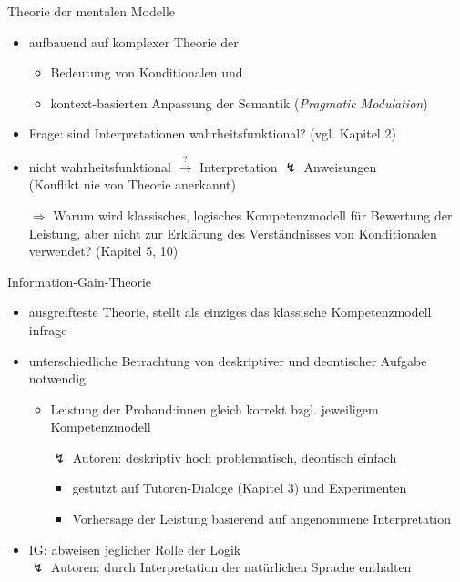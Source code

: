 \begin{frame}{Theorie der mentalen Modelle {\scriptsize \cite[S.~113-114]{stenningHumanReasoningCognitive2008}}}
    \begin{itemize}
        \item aufbauend auf komplexer Theorie der
        \begin{itemize}
            \item Bedeutung von Konditionalen und
            \item kontext-basierten Anpassung der Semantik {\footnotesize (\emph{Pragmatic Modulation})}
        \end{itemize}
        
        \item Frage: sind Interpretationen wahrheitsfunktional? {\scriptsize (vgl. Kapitel 2)}
        
        \item nicht wahrheitsfunktional $\overset?\to$ Interpretation $\lightning$ Anweisungen \\
            {\footnotesize (Konflikt nie von Theorie anerkannt)}
        \pause

        \item[$\Rightarrow$] Warum wird klassisches, logisches Kompetenzmodell für \alert{Bewertung der Leistung}, 
            aber nicht zur Erklärung des \alert{Verständnisses von Konditionalen} verwendet? {\footnotesize (Kapitel 5, 10)}
    \end{itemize}
\end{frame}


\begin{frame}{Information-Gain-Theorie {\scriptsize \cite[S.~114-115]{stenningHumanReasoningCognitive2008}}}
    \begin{itemize}
        \item ausgreifteste Theorie, stellt als einziges das klassische Kompetenzmodell infrage
        \item unterschiedliche Betrachtung von deskriptiver und deontischer Aufgabe notwendig
        
        \pause
        \begin{itemize}
            \item Leistung der Proband:innen gleich korrekt bzgl. jeweiligem Kompetenzmodell
            \item[$\lightning$] Autoren: deskriptiv hoch problematisch, deontisch einfach
            \begin{itemize}
                \item gestützt auf Tutoren-Dialoge (Kapitel 3) und Experimenten
                \item Vorhersage der Leistung basierend auf angenommene Interpretation
            \end{itemize}
        \end{itemize}

        \pause
        \item IG: abweisen jeglicher Rolle der Logik \\
            $\lightning$ Autoren: durch Interpretation der natürlichen Sprache enthalten
    \end{itemize}
\end{frame}


